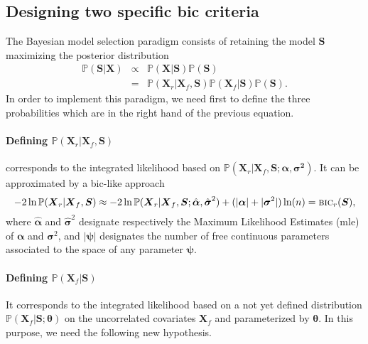 \documentclass[11pt,a4paper]{article}
\begin{document}
\subsection{Designing two specific {\sc bic} criteria}

The Bayesian model selection paradigm consists of retaining the model $\boldsymbol{S}$ maximizing the posterior distribution \cite{raftery1995bayesian,andrieu1999joint,chipman2001practical}
\begin{eqnarray}
 \mathbb{P}(\boldsymbol{S}|\boldsymbol{X})&\propto & \mathbb{P}(\boldsymbol{X}|\boldsymbol{S})\mathbb{P}(\boldsymbol{S}) \\
	&=&\mathbb{P}(\boldsymbol{X}_r|\boldsymbol{X}_f,\boldsymbol{S})\mathbb{P}(\boldsymbol{X}_f|\boldsymbol{S})\mathbb{P}(\boldsymbol{S}).
\end{eqnarray}
In order to implement this paradigm, we need first to define the three probabilities which are in the right hand of the previous equation.

\paragraph{Defining $\mathbb{P}(\boldsymbol{X}_r|\boldsymbol{X}_f,\boldsymbol{S})$} corresponds to the integrated likelihood based on $\mathbb{P}(\boldsymbol{X}_r | \boldsymbol{X}_f,\boldsymbol{S};\boldsymbol{\alpha},\boldsymbol{\sigma^2})$. It can be approximated by a {\sc bic}-like approach \cite{Sch1978}
\begin{equation}
-2\ln \mathbb{P}(\boldsymbol{X}_r|\boldsymbol{X}_f,\boldsymbol{S}) \approx -2\ln \mathbb{P}(\boldsymbol{X}_r | \boldsymbol{X}_f,\boldsymbol{S};\hat{\boldsymbol{\alpha}},\hat{\boldsymbol{\sigma}}^2) + (|{\boldsymbol{\alpha}}| + |{\boldsymbol{\sigma}}^2|) \ln(n) = \mbox{{\sc bic}}_r(\boldsymbol{S}),
\end{equation}
where $\hat{\boldsymbol{\alpha}}$ and $\hat{\boldsymbol{\sigma}}^2$ designate respectively the Maximum Likelihood Estimates ({\sc mle}) of ${\boldsymbol{\alpha}}$ and ${\boldsymbol{\sigma}}^2$, and $|\boldsymbol{\psi}|$ designates the number of free continuous parameters associated to the space of any parameter $\boldsymbol{\psi}$.

\paragraph{Defining $\mathbb{P}(\boldsymbol{X}_f|\boldsymbol{S})$} It corresponds to the integrated likelihood based on a not yet defined distribution $\mathbb{P}(\boldsymbol{X}_f|\boldsymbol{S};\boldsymbol{\theta})$ on the uncorrelated covariates $\boldsymbol{X}_f$ and parameterized by $\boldsymbol{\theta}$. In this purpose, we need the following new hypothesis.
\end{document}
